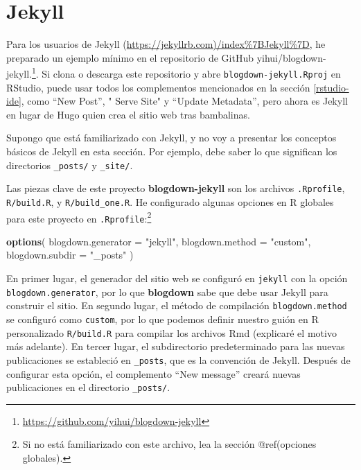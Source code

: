 \documentclass[12pt,]{krantz}
\makeatletter
\newenvironment{Shaded}{\begin{snugshade}}{\end{snugshade}}
\newcommand{\DataTypeTok}[1]{\textcolor[rgb]{0.13,0.29,0.53}{#1}}
\newcommand{\KeywordTok}[1]{\textcolor[rgb]{0.13,0.29,0.53}{\textbf{#1}}}
\newcommand{\NormalTok}[1]{#1}
\newcommand{\StringTok}[1]{\textcolor[rgb]{0.31,0.60,0.02}{#1}}
\renewcommand{\href}[2]{#2\footnote{\url{#1}}}
\newenvironment{kframe}{%
\medskip{}
\setlength{\fboxsep}{.8em}
 \def\at@end@of@kframe{}%
 \ifinner\ifhmode%
  \def\at@end@of@kframe{\end{minipage}}%
  \begin{minipage}{\columnwidth}%
 \fi\fi%
 \def\FrameCommand##1{\hskip\@totalleftmargin \hskip-\fboxsep
 \colorbox{shadecolor}{##1}\hskip-\fboxsep
     \hskip-\linewidth \hskip-\@totalleftmargin \hskip\columnwidth}%
 \MakeFramed {\advance\hsize-\width
   \@totalleftmargin\z@ \linewidth\hsize
   \@setminipage}}%
 {\par\unskip\endMakeFramed%
 \at@end@of@kframe}
\renewenvironment{Shaded}{\begin{kframe}}{\end{kframe}}
\theoremstyle{definition}
\theoremstyle{definition}
\theoremstyle{definition}
\theoremstyle{remark}
\makeatother
\begin{document}
\hypertarget{jekyll}{%
\section{Jekyll}\label{jekyll}}

Para los usuarios de Jekyll
(\url{https://jekyllrb.com)/index\%7BJekyll\%7D}, he preparado un
ejemplo mínimo en el repositorio de GitHub
\href{https://github.com/yihui/blogdown-jekyll}{yihui/blogdown-jekyll.}.
Si clona o descarga este repositorio y abre
\texttt{blogdown-jekyll.Rproj} en RStudio, puede usar todos los
complementos mencionados en la sección \ref{rstudio-ide}, como ``New
Post'', " Serve Site" y ``Update Metadata'', pero ahora es Jekyll en
lugar de Hugo quien crea el sitio web tras bambalinas.

Supongo que está familiarizado con Jekyll, y no voy a presentar los
conceptos básicos de Jekyll en esta sección. Por ejemplo, debe saber lo
que significan los directorios \texttt{\_posts/} y \texttt{\_site/}.

Las piezas clave de este proyecto \textbf{blogdown-jekyll} son los
archivos \texttt{.Rprofile}, \texttt{R/build.R}, y
\texttt{R/build\_one.R}. He configurado algunas opciones en R globales
para este proyecto en \texttt{.Rprofile}:\footnote{Si no está
  familiarizado con este archivo, lea la sección @ref(opciones
  globales).}

\begin{Shaded}
\begin{Highlighting}[]
\KeywordTok{options}\NormalTok{(}
  \DataTypeTok{blogdown.generator =} \StringTok{"jekyll"}\NormalTok{,}
  \DataTypeTok{blogdown.method =} \StringTok{"custom"}\NormalTok{,}
  \DataTypeTok{blogdown.subdir =} \StringTok{"_posts"}
\NormalTok{)}
\end{Highlighting}
\end{Shaded}

En primer lugar, el generador del sitio web se configuró en
\texttt{jekyll} con la opción \texttt{blogdown.generator}, por lo que
\textbf{blogdown} sabe que debe usar Jekyll para construir el sitio. En
segundo lugar, el método de compilación \texttt{blogdown.method} se
configuró como \texttt{custom}, por lo que podemos definir nuestro guión
en R personalizado \texttt{R/build.R} para compilar los archivos Rmd
(explicaré el motivo más adelante). En tercer lugar, el subdirectorio
predeterminado para las nuevas publicaciones se estableció en
\texttt{\_posts}, que es la convención de Jekyll. Después de configurar
esta opción, el complemento ``New message'' creará nuevas publicaciones
en el directorio \texttt{\_posts/}.
\end{document}
